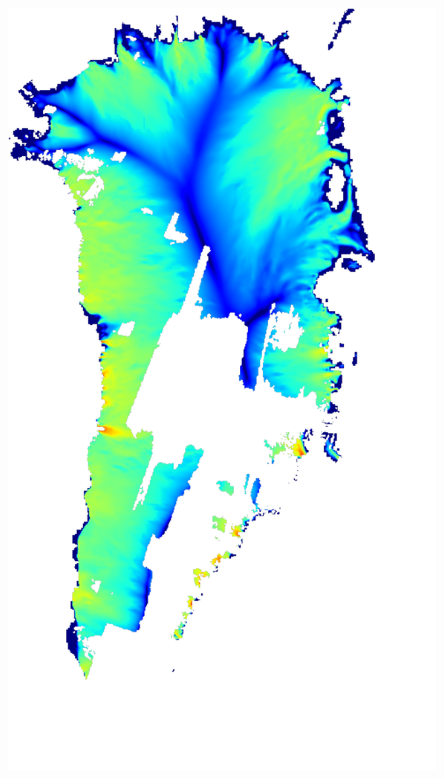 \documentclass{beamer}
\begin{document}
\begin{frame}
\begin{columns}
\begin{column}{0.33\textwidth}
\begin{center}
  \includegraphics[width=0.85\textwidth]{g3km_3_10_98}
\end{center}
\end{column}
\end{columns}
\end{frame}
\end{document}

